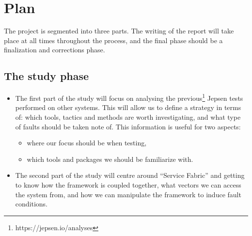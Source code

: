 \section{Plan}
     
The project is segmented into three parts. The writing of the report will take place at all times throughout the process, and the final phase should be a finalization and corrections phase.  
\subsection{The study phase  }
\begin{itemize}
\item	The first part of the study will focus on analysing the previous\footnote[6]{https://jepsen.io/analyses } Jepsen tests performed on other systems. This will allow us to define a strategy in terms of: which tools, tactics and methods are worth investigating, and what type of faults should be taken note of. This information is useful for two aspects:
\begin{itemize}
\item	where our focus should be when testing,  
\item	which tools and packages we should be familiarize with. 
\end{itemize}
\item	 The second part of the study will centre around “Service Fabric” and getting to know how the framework is coupled together, what vectors we can access the system from, and how we can manipulate the framework to induce fault conditions.   
\end{itemize}
